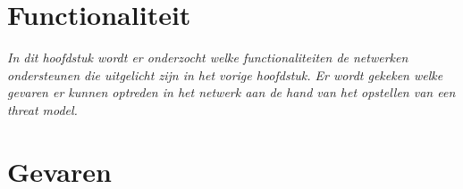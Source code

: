 \section{Functionaliteit}

\textit{In dit hoofdstuk wordt er onderzocht welke functionaliteiten de netwerken ondersteunen die uitgelicht zijn in het vorige hoofdstuk. Er wordt gekeken welke gevaren er kunnen optreden in het netwerk aan de hand van het opstellen van een threat model.}


\clearpage

\clearpage

\clearpage


\clearpage
\section{Gevaren}



\clearpage



\newpage


\newpage


\newpage


\newpage

